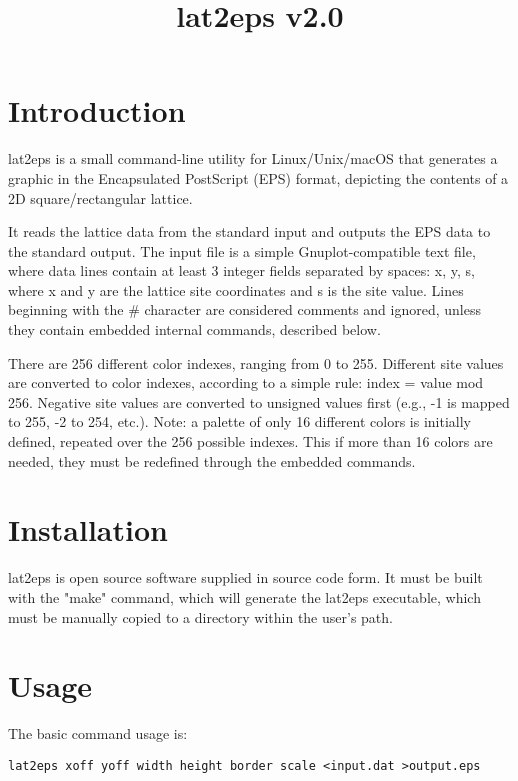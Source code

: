 \documentclass[a4paper]{article}
\title{\vspace{-10ex}lat2eps v2.0}
\date{\vspace{-5ex}}
\begin{document}
\maketitle


\section{Introduction}

lat2eps is a small command-line utility for Linux/Unix/macOS that generates a graphic in the Encapsulated PostScript (EPS) format, depicting the contents of a 2D square/rectangular lattice.
\bigbreak

It reads the lattice data from the standard input and outputs the EPS data to the standard output. The input file is a simple Gnuplot-compatible text file, where data lines contain at least 3 integer fields separated by spaces: x, y, s, where x and y are the lattice site coordinates and s is the site value. Lines beginning with the \# character are considered comments and ignored, unless they contain embedded internal commands, described below.
\bigbreak

There are 256 different color indexes, ranging from 0 to 255. Different site values are converted to color indexes, according to a simple rule: index = value mod 256. Negative site values are converted to unsigned values first (e.g., -1 is mapped to 255, -2 to 254, etc.). Note: a palette of only 16 different colors is initially defined, repeated over the 256 possible indexes. This if more than 16 colors are needed, they must be redefined through the embedded commands.\bigbreak


\section{Installation}

lat2eps is open source software supplied in source code form. It must be built with the "make" command, which will generate the lat2eps executable, which must be manually copied to a directory within the user's path.


\section{Usage}

The basic command usage is:
\bigbreak

\texttt{lat2eps  xoff yoff width height border scale  <input.dat  >output.eps}
\bigbreak
\end{document}
